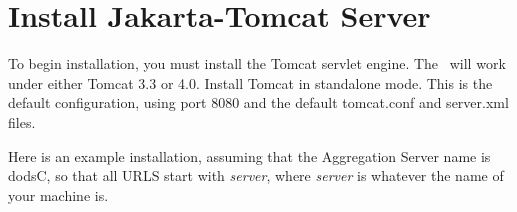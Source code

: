 \documentclass{dods-book}
\begin{document}
\section{Install Jakarta-Tomcat Server}
\label{aggser,installinstruct}


To begin installation, you must install the Tomcat servlet engine.
The \aggser\ will work under either Tomcat 3.3 or 4.0.  Install Tomcat
in standalone mode.  This is the default configuration, using
port 8080 and the default tomcat.conf and server.xml files.

Here is an example installation, assuming that the Aggregation Server
name is dodsC, so that all URLS start with \emph{server},
where \emph{server} is whatever the name of your machine is.
\end{document}
